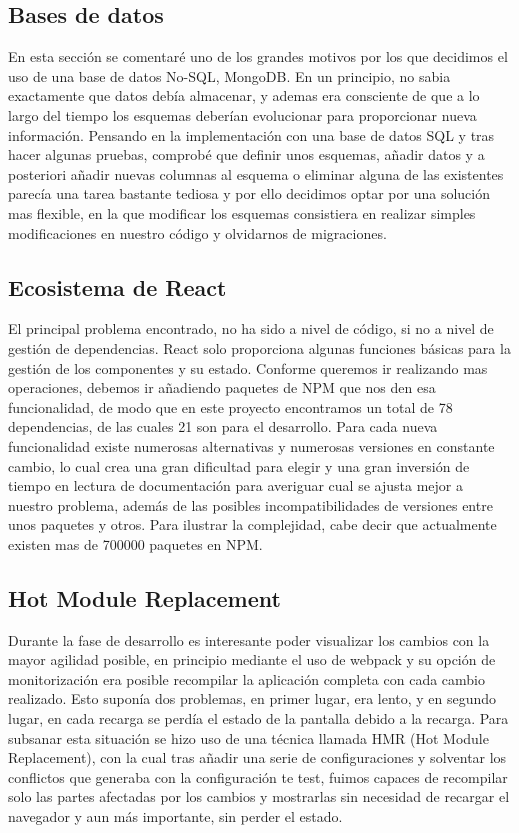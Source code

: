 \subsection {Bases de datos}
En esta sección se comentaré uno de los grandes motivos por los que decidimos el uso de una base de datos No-SQL, MongoDB. En un principio, no sabia exactamente que datos debía almacenar, y ademas era consciente de que a lo largo del tiempo los esquemas deberían evolucionar para proporcionar nueva información. Pensando en la implementación con una base de datos SQL y tras hacer algunas pruebas, comprobé que definir unos esquemas, añadir datos y a posteriori añadir nuevas columnas al esquema o eliminar alguna de las existentes parecía una tarea bastante tediosa y por ello decidimos optar por una solución mas flexible, en la que modificar los esquemas consistiera en realizar simples modificaciones en nuestro código y olvidarnos de migraciones.

\subsection {Ecosistema de React}
El principal problema encontrado, no ha sido a nivel de código, si no a nivel de gestión de dependencias. React solo proporciona algunas funciones básicas para la gestión de los componentes y su estado. Conforme queremos ir realizando mas operaciones, debemos ir añadiendo paquetes de NPM que nos den esa funcionalidad, de modo que en este proyecto encontramos un total de 78 dependencias, de las cuales 21 son para el desarrollo. Para cada nueva funcionalidad existe numerosas alternativas y numerosas versiones en constante cambio, lo cual crea una gran dificultad para elegir y una gran inversión de tiempo en lectura de documentación para averiguar cual se ajusta mejor a nuestro problema, además de las posibles incompatibilidades de versiones entre unos paquetes y otros. Para ilustrar la complejidad, cabe decir que actualmente existen mas de 700000 paquetes en NPM.

\subsection {Hot Module Replacement}
Durante la fase de desarrollo es interesante poder visualizar los cambios con la mayor agilidad posible, en principio mediante el uso de webpack y su opción de monitorización era posible recompilar la aplicación completa con cada cambio realizado. Esto suponía dos problemas, en primer lugar, era lento, y en segundo lugar, en cada recarga se perdía el estado de la pantalla debido a la recarga. Para subsanar esta situación se hizo uso de una técnica llamada HMR (Hot Module Replacement), con la cual tras añadir una serie de configuraciones y solventar los conflictos que generaba con la configuración te test, fuimos capaces de recompilar solo las partes afectadas por los cambios y mostrarlas sin necesidad de recargar el navegador y aun más importante, sin perder el estado.









